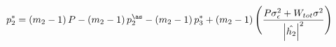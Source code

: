\documentclass[preview]{standalone}
\begin{document}
\begin{align*}
p_2^\ast = \left(m_2 - 1\right) P - \left(m_2 - 1\right) p_2^\as - \left(m_2 - 1\right) p_3^\ast + \left(m_2 - 1\right) \Bigg( \frac{P \sigma_\epsilon^2 + W_{tot} \sigma^2}{\left|\hat{h_2}\right|^2} \Bigg)
\end{align*}
\end{document}
